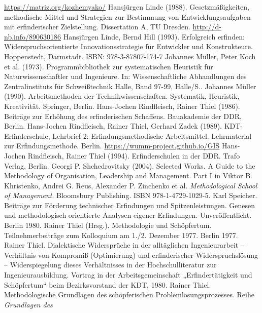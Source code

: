 \documentclass[11pt,a4paper]{article}
\begin{document}
\begin{thebibliography}{xxx}
  \url{https://matriz.org/kozhemyako/}
 Hansjürgen Linde (1988). Gesetzmäßigkeiten, methodische
  Mittel und Strategien zur Bestimmung von Entwicklungsaufgaben mit
  erfinderischer Zielstellung.  Dissertation A, TU Dresden.
  \url{http://d-nb.info/890630186}
 Hansjürgen Linde, Bernd Hill (1993).  Erfolgreich
  erfinden: Widerspruchsorientierte Innovationsstrategie für Entwickler und
  Konstrukteure.  Hoppenstedt, Darmstadt.  ISBN: 978-3-87807-174-7
 Johannes Müller, Peter Koch et al. (1973).
  Programmbibliothek zur systematischen Heuristik für Naturwissenschaftler und
  Ingenieure. In: Wissenschaftliche Abhandlungen des Zentralinstituts für
  Schweißtechnik Halle, Band 97-99, Halle/S..
 Johannes Müller (1990). Arbeitsmethoden der
  Technikwissenschaften.  Systematik, Heuristik, Kreativität. Springer,
  Berlin.
 Hans-Jochen Rindfleisch, Rainer Thiel (1986). Beiträge zur
  Erhöhung des erfinderischen Schaffens. Bauakademie der DDR, Berlin.
 Hans-Jochen Rindfleisch, Rainer Thiel, Gerhard Zadek (1989).
  KDT-Erfinderschule, Lehrbrief 2: Erfindungs­methodische Arbeitsmittel.
  Lehrmaterial zur Erfindungsmethode. Berlin.
  \url{https://wumm-project.github.io/GIS}
 Hans-Jochen Rindfleisch, Rainer Thiel (1994). Erfinderschulen
  in der DDR. Trafo Verlag, Berlin.
 Georgi P. Shchedrovitsky (2004). Selected Works.  A
  Guide to the Methodology of Organisation, Leadership and Management.  Part I
  in Viktor B. Khristenko, Andrei G. Reus, Alexander P. Zinchenko et
  al. \emph{Methodological School of Management}. Bloomsbury Publishing. ISBN
  978-1-4729-1029-5.
 Karl Speicher. Beiträge zur Förderung technischer
  Erfindungen und Spitzenleistungen. Genesen und methodologisch orientierte
  Analysen eigener Erfindungen. Unveröffentlicht. Berlin 1980.
 Rainer Thiel (Hrsg.). Methodologie und Schöpfertum.
  Teilnehmerbeiträge zum Kolloquium am 1./2. Dezember 1977. Berlin 1977.
 Rainer Thiel. Dialektische Widersprüche in der
  alltäglichen Ingenieurarbeit -- Verhältnis von Kompromiß (Optimierung) und
  erfinderischer Widerspruchslösung -- Widerspiegelung dieses Verhältnisses in
  der Hochschulliteratur zur Ingenieurausbildung. Vortrag in der
  Arbeitsgemeinschaft „Erfindertätigkeit und Schöpfertum“ beim Bezirksvorstand
  der KDT, 1980.
 Rainer Thiel.  Methodologische Grundlagen des
  schöpferischen Problem\-lösungs\-pro\-zesses. Reihe \emph{Grundlagen des
}
\end{thebibliography}
\end{document}
